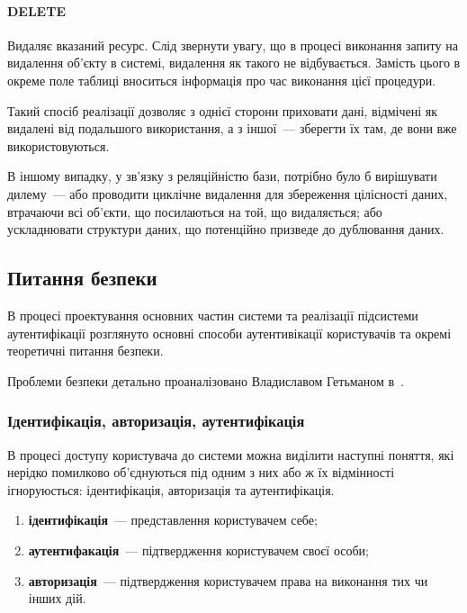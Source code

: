 \paragraph{DELETE}

Видаляє вказаний ресурс.
Слід звернути увагу, що в процесі виконання запиту на видалення об’єкту в системі, видалення як такого не відбувається. Замість цього в окреме поле таблиці вноситься інформація про час виконання цієї процедури.

Такий спосіб реалізації дозволяє з однієї сторони приховати дані, відмічені як видалені від подальшого використання, а з іншої~--- зберегти їх там, де вони вже використовуються. 

В іншому випадку, у зв’язку з реляційністю бази, потрібно було б вирішувати дилему~--- або проводити циклічне видалення для збереження цілісності даних, втрачаючи всі об’єкти, що посилаються на той, що видаляється; або ускладнювати структури даних, що потенційно призведе до дублювання даних.



\subsection{Питання безпеки} \label{subs:security}

В процесі проектування основних частин системи та реалізації підсистеми аутентифікації розглянуто основні способи аутентивікації користувачів та окремі теоретичні питання безпеки. 

Проблеми безпеки детально проаналізовано Владиславом Гетьманом в~\cite{гетьман2020}.

\subsubsection{Ідентифікація, авторизація, аутентифікація} \label{subs:access}
В процесі доступу користувача до системи можна виділити наступні поняття, які нерідко помилково об'єднуються під одним з них або ж їх відмінності ігноруюсться: ідентифікація, авторизація та аутентифікація.
\begin{enumerate}
\item \textbf{ідентифікація}~--- представлення користувачем себе;
\item \textbf{аутентифакація}~--- підтвердження користувачем своєї особи;
\item \textbf{авторизація}~--- підтвердження користувачем права на виконання тих чи інших дій.
\end{enumerate}

